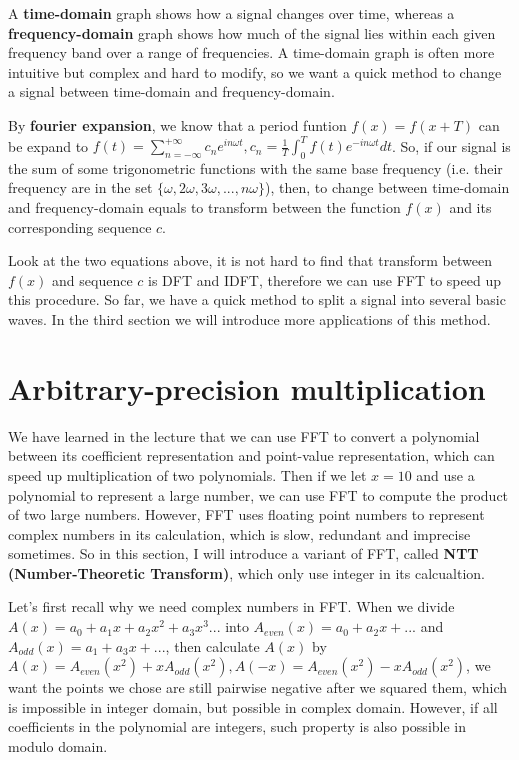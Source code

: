 \documentclass{article}
\begin{document}
A \textbf{time-domain} graph shows how a signal changes over time, whereas a \textbf{frequency-domain} graph shows how much of the signal lies within each given frequency band over a range of frequencies. A time-domain graph is often more intuitive but complex and hard to modify, so we want a quick method to change a signal between time-domain and frequency-domain.

By \textbf{fourier expansion}, we know that a period funtion $f(x)=f(x+T)$ can be expand to $f(t)=\sum_{n=-\infty}^{+\infty}c_ne^{in\omega t},c_n=\frac{1}{T}\int_{0}^{T}f(t)e^{-in\omega t}dt$. So, if our signal is the sum of some trigonometric functions with the same base frequency (i.e. their frequency are in the set $\{\omega,2\omega,3\omega,...,n\omega\}$), then, to change between time-domain and frequency-domain equals to transform between the function $f(x)$ and its corresponding sequence $c$.

Look at the two equations above, it is not hard to find that transform between $f(x)$ and sequence $c$ is DFT and IDFT, therefore we can use FFT to speed up this procedure. So far, we have a quick method to split a signal into several basic waves. In the third section we will introduce more applications of this method.

\section{Arbitrary-precision multiplication}

We have learned in the lecture that we can use FFT to convert a polynomial between its coefficient representation and point-value representation, which can speed up multiplication of two polynomials. Then if we let $x=10$ and use a polynomial to represent a large number, we can use FFT to compute the product of two large numbers. However, FFT uses floating point numbers to represent complex numbers in its calculation, which is slow, redundant and imprecise sometimes. So in this section, I will introduce a variant of FFT, called \textbf{NTT (Number-Theoretic Transform)}, which only use integer in its calcualtion.

Let's first recall why we need complex numbers in FFT. When we divide $A(x)=a_0+a_1x+a_2x^2+a_3x^3...$ into $A_{even}(x)=a_0+a_2x+...$ and $A_{odd}(x)=a_1+a_3x+...$, then calculate $A(x)$ by $A(x)=A_{even}(x^2)+xA_{odd}(x^2),A(-x)=A_{even}(x^2)-xA_{odd}(x^2)$, we want the points we chose are still pairwise negative after we squared them, which is impossible in integer domain, but possible in complex domain. However, if all coefficients in the polynomial are integers, such property is also possible in modulo domain.
\end{document}
